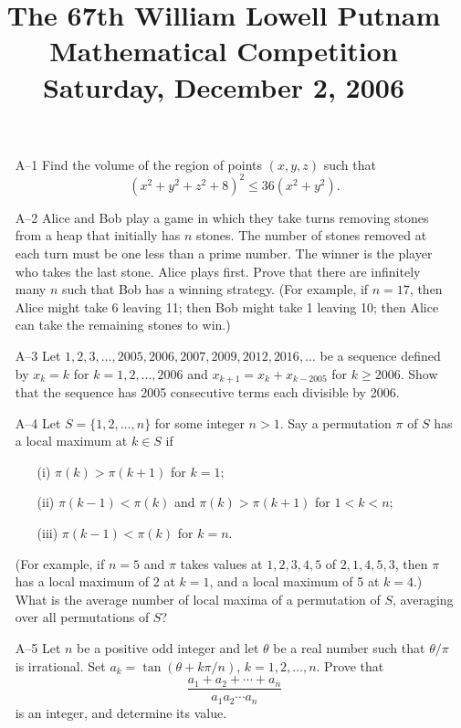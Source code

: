 \documentclass[amssymb,twocolumn,pra,10pt,aps]{revtex4-1}
\begin{document}
\title{The 67th William Lowell Putnam Mathematical Competition \\
    Saturday, December 2, 2006}
\maketitle

\begin{itemize}

\item[A--1]
Find the volume of the region of points $(x,y,z)$ such that
\[
(x^2 + y^2 + z^2 + 8)^2 \leq 36(x^2 + y^2).
\]

\item[A--2]
Alice and Bob play a game in which they take turns removing stones from
a heap that initially has $n$ stones. The number of stones removed at
each turn must be one less than a prime number. The winner is the player
who takes the last stone. Alice plays first. Prove that there are
infinitely many $n$ such that Bob has a winning strategy.
(For example, if $n=17$, then Alice might take 6 leaving 11; then
Bob might take 1 leaving 10; then Alice can take the remaining stones
to win.)

\item[A--3]
Let $1, 2, 3, \dots, 2005, 2006, 2007, 2009, 2012, 2016, \dots$
be a sequence defined by $x_k = k$ for $k=1, 2, \dots, 2006$ and
$x_{k+1} = x_k + x_{k-2005}$ for $k \geq 2006$. Show that the sequence has
2005 consecutive terms each divisible by 2006.

\item[A--4]
Let $S = \{1, 2, \dots, n\}$ for some integer $n > 1$. Say a permutation
$\pi$ of $S$ has a local maximum at $k \in S$ if
\begin{enumerate}
\item[(i)]
$\pi(k) > \pi(k+1)$ for $k=1$;
\item[(ii)]
$\pi(k-1) < \pi(k)$ and $\pi(k) > \pi(k+1)$ for $1 < k < n$;
\item[(iii)]
$\pi(k-1) < \pi(k)$ for $k=n$.
\end{enumerate}
(For example, if $n=5$ and $\pi$ takes values at $1, 2, 3, 4, 5$ of
$2, 1, 4, 5, 3$, then $\pi$ has a local maximum of 2 at $k=1$,
and a local maximum of 5 at $k=4$.)
What is the average number of local maxima of a permutation of $S$,
averaging over all permutations of $S$?

\item[A--5]
Let $n$ be a positive odd integer and let $\theta$ be a real number such
that $\theta/\pi$ is irrational. Set $a_k = \tan (\theta + k \pi/n)$,
$k=1,2,\dots,n$. Prove that
\[
\frac{a_1 + a_2 + \cdots + a_n}{a_1 a_2 \cdots a_n}
\]
is an integer, and determine its value.


\end{itemize}
\end{document}
